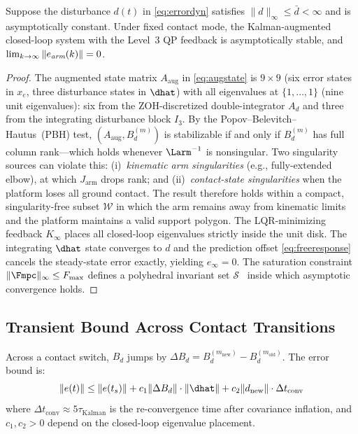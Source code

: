 \begin{theorem}\label{thm:zss}
Suppose the disturbance $d(t)$ in \eqref{eq:errordyn} satisfies
$\|d\|_\infty\leq\bar{d}<\infty$ and is asymptotically constant.
Under fixed contact mode, the Kalman-augmented closed-loop system with the
Level~3 QP feedback is asymptotically stable, and
$\lim_{k\to\infty}\|e_{\emph{arm}}(k)\|=0$.
\end{theorem}

\begin{proof}
The augmented state matrix $A_{\text{aug}}$ in \eqref{eq:augstate} is
$9\times9$ (six error states in $x_e$, three disturbance states in $\dhat$)
with all eigenvalues at $\{1,\ldots,1\}$ (nine unit eigenvalues): six from
the ZOH-discretized double-integrator $A_d$ and three from the integrating
disturbance block $I_3$.
By the Popov--Belevitch--Hautus~(PBH) test,
$(A_{\text{aug}},B_d^{(m)})$ is stabilizable if and only if $B_d^{(m)}$
has full column rank---which holds whenever $\Larm^{-1}$ is nonsingular.
Two singularity sources can violate this: (i)~\emph{kinematic arm
singularities} (e.g., fully-extended elbow), at which $J_{\text{arm}}$
drops rank; and (ii)~\emph{contact-state singularities} when the platform
loses all ground contact.
The result therefore holds within a compact, singularity-free subset
$\mathcal{W}$ in which the arm remains away from kinematic limits and the
platform maintains a valid support polygon.
The LQR-minimizing feedback $K_\infty$ places all closed-loop eigenvalues
strictly inside the unit disk.
The integrating $\dhat$ state converges to $d$ and the prediction offset
\eqref{eq:freeresponse} cancels the steady-state error exactly, yielding
$e_\infty=0$.
The saturation constraint $\|\Fmpc\|_\infty\leq F_{\max}$ defines a
polyhedral invariant set $\mathcal{S}$~\cite{cao2002antiwindup} inside which
asymptotic convergence holds.
\end{proof}

\subsection{Transient Bound Across Contact Transitions}

Across a contact switch, $B_d$ jumps by
$\Delta B_d=B_d^{(m_{\text{new}})}-B_d^{(m_{\text{old}})}$.
The error bound is:
\begin{equation}\label{eq:transient}
  \|e(t)\| \leq \|e(t_s)\|
    + c_1\|\Delta B_d\|\cdot\|\dhat\|
    + c_2\|d_{\text{new}}\|\cdot\Delta t_{\text{conv}}
\end{equation}
where $\Delta t_{\text{conv}}\approx5\tau_{\text{Kalman}}$ is the
re-convergence time after covariance inflation, and $c_1,c_2>0$ depend on
the closed-loop eigenvalue placement.

